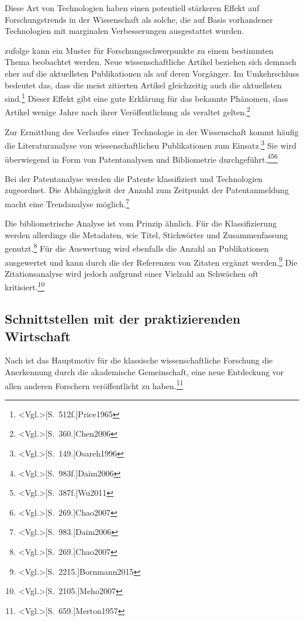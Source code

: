 Diese Art von Technologien haben einen potentiell stärkeren Effekt auf Forschungstrends in der Wissenschaft als solche, die auf Basis vorhandener Technologien mit marginalen Verbesserungen ausgestattet wurden.

 zufolge kann ein Muster für Forschungsschwerpunkte zu einem bestimmten Thema beobachtet werden. Neue wissenschaftliche Artikel beziehen sich demnach eher auf die aktuellsten Publikationen als auf deren Vorgänger. Im Umkehrschluss bedeutet das, dass die meist zitierten Artikel gleichzeitig auch die aktuellsten sind.\footnote{\citeNP<Vgl.>[S.~512f.]{Price1965}} Dieser Effekt gibt eine gute Erklärung für das bekannte Phänomen, dass Artikel wenige Jahre nach ihrer Veröffentlichung als veraltet gelten.\footnote{\citeNP<Vgl.>[S.~360.]{Chen2006}}

Zur Ermittlung des Verlaufes einer Technologie in der Wissenschaft kommt häufig die Literaturanalyse von wissenschaftlichen Publikationen zum Einsatz.\footnote{\citeNP<Vgl.>[S.~149.]{Osareh1996}} Sie wird überwiegend in Form von Patentanalysen und Bibliometrie durchgeführt.\footnote{\citeNP<Vgl.>[S.~983f.]{Daim2006}}\footnote{\citeNP<Vgl.>[S.~387f.]{Wu2011}}\footnote{\citeNP<Vgl.>[S.~269.]{Chao2007}}

Bei der Patentanalyse werden die Patente klassifiziert und Technologien zugeordnet. Die Abhängigkeit der Anzahl zum Zeitpunkt der Patentanmeldung macht eine Trendanalyse möglich.\footnote{\citeNP<Vgl.>[S.~983.]{Daim2006}}

\label{sec:biblio}
Die bibliometrische Analyse ist vom Prinzip ähnlich. Für die Klassifizierung werden allerdings die Metadaten, wie Titel, Stichwörter und Zusammenfassung genutzt.\footnote{\citeNP<Vgl.>[S.~269.]{Chao2007}} Für die Auswertung wird ebenfalls die Anzahl an Publikationen ausgewertet und kann durch die der Referenzen von Zitaten ergänzt werden.\footnote{\citeNP<Vgl.>[S.~2215.]{Bornmann2015}} Die Zitationsanalyse wird jedoch aufgrund einer Vielzahl an Schwächen oft kritisiert.\footnote{\citeNP<Vgl.>[S.~2105.]{Meho2007}}

\subsection{Schnittstellen mit der praktizierenden Wirtschaft}
Nach  ist das Hauptmotiv für die klassische wissenschaftliche Forschung die Anerkennung durch die akademische Gemeinschaft, eine neue Entdeckung vor allen anderen Forschern veröffentlicht zu haben.\footnote{\citeNP<Vgl.>[S.~659.]{Merton1957}}

